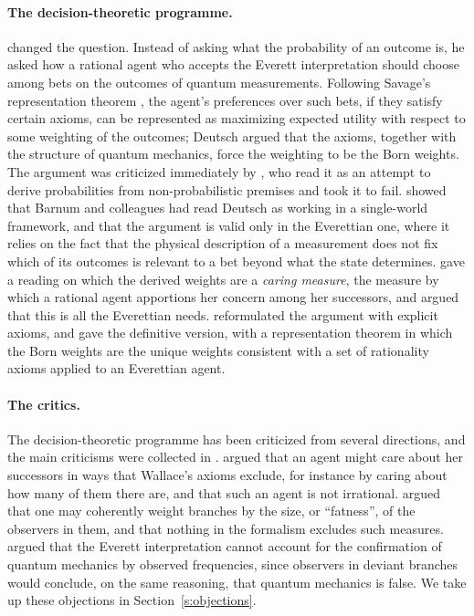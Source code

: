 \documentclass{situationist-preprint}
\begin{document}
\paragraph{The decision-theoretic programme.} \citet{Deutsch1999} changed the question. Instead of asking what the probability of an outcome is, he asked how a rational agent who accepts the Everett interpretation should choose among bets on the outcomes of quantum measurements. Following Savage's representation theorem \citep{Savage1954}, the agent's preferences over such bets, if they satisfy certain axioms, can be represented as maximizing expected utility with respect to some weighting of the outcomes; Deutsch argued that the axioms, together with the structure of quantum mechanics, force the weighting to be the Born weights. The argument was criticized immediately by \citet{Barnum2000}, who read it as an attempt to derive probabilities from non-probabilistic premises and took it to fail. \citet{Wallace2003b} showed that Barnum and colleagues had read Deutsch as working in a single-world framework, and that the argument is valid only in the Everettian one, where it relies on the fact that the physical description of a measurement does not fix which of its outcomes is relevant to a bet beyond what the state determines. \citet{Greaves2004} gave a reading on which the derived weights are a \emph{caring measure}, the measure by which a rational agent apportions her concern among her successors, and argued that this is all the Everettian needs. \citet{Wallace2007,Wallace2010} reformulated the argument with explicit axioms, and \citet{Wallace2012} gave the definitive version, with a representation theorem in which the Born weights are the unique weights consistent with a set of rationality axioms applied to an Everettian agent.

\paragraph{The critics.} The decision-theoretic programme has been criticized from several directions, and the main criticisms were collected in \citet{Saunders2010}. \citet{Price2010} argued that an agent might care about her successors in ways that Wallace's axioms exclude, for instance by caring about how many of them there are, and that such an agent is not irrational. \citet{Albert2010} argued that one may coherently weight branches by the size, or \enquote{fatness}, of the observers in them, and that nothing in the formalism excludes such measures. \citet{Kent2010} argued that the Everett interpretation cannot account for the confirmation of quantum mechanics by observed frequencies, since observers in deviant branches would conclude, on the same reasoning, that quantum mechanics is false. We take up these objections in Section~\ref{s:objections}.
\end{document}
